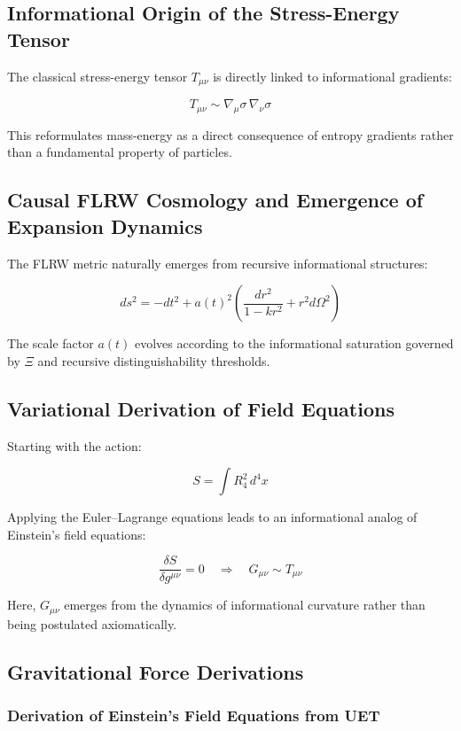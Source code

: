 \documentclass[12pt,a4paper]{article}
\begin{document}
\subsection{Informational Origin of the Stress-Energy Tensor}

The classical stress-energy tensor \(T_{\mu\nu}\) is directly linked to informational gradients:

\[
T_{\mu\nu} \sim \nabla_\mu \sigma \, \nabla_\nu \sigma
\]

This reformulates mass-energy as a direct consequence of entropy gradients rather than a fundamental property of particles.

\subsection{Causal FLRW Cosmology and Emergence of Expansion Dynamics}

The FLRW metric naturally emerges from recursive informational structures:

\[
ds^2 = -dt^2 + a(t)^2 \left( \frac{dr^2}{1 - k r^2} + r^2 d\Omega^2 \right)
\]

The scale factor \(a(t)\) evolves according to the informational saturation governed by \(\Xi\) and recursive distinguishability thresholds.

\subsection{Variational Derivation of Field Equations}

Starting with the action:

\[
S = \int R_4^2 \, d^4x
\]

Applying the Euler–Lagrange equations leads to an informational analog of Einstein’s field equations:

\[
\frac{\delta S}{\delta g^{\mu\nu}} = 0 \quad \Rightarrow \quad G_{\mu\nu} \sim T_{\mu\nu}
\]

Here, \(G_{\mu\nu}\) emerges from the dynamics of informational curvature rather than being postulated axiomatically.
\subsection{Gravitational Force Derivations}

\subsubsection{Derivation of Einstein’s Field Equations from UET}
\end{document}
